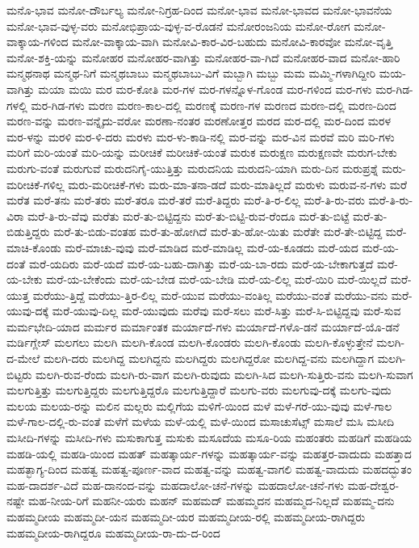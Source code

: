 {ಮನೊ-ಭಾವ
ಮನೋ-ದೌರ್ಬಲ್ಯ
ಮನೋ-ನಿಗ್ರಹ-ದಿಂದ
ಮನೋ-ಭಾವ
ಮನೋ-ಭಾವದ
ಮನೋ-ಭಾವನೆಯ
ಮನೋ-ಭಾವ-ವುಳ್ಳ-ವರು
ಮನೋಭಿಪ್ರಾಯ-ವುಳ್ಳ-ವ-ರೊಡನೆ
ಮನೋರಂಜನಿಯ
ಮನೋ-ರೋಗ
ಮನೋ-ವಾಕ್ಕಾಯ-ಗಳಿಂದ
ಮನೋ-ವಾಕ್ಕಾಯ-ವಾಗಿ
ಮನೋವಿ-ಕಾರ-ವಿರ-ಬಹುದು
ಮನೋವಿ-ಕಾರವೋ
ಮನೋ-ವೃತ್ತಿ
ಮನೋ-ಶಕ್ತಿ-ಯನ್ನು
ಮನೋಹರ
ಮನೋಹರ-ವಾಗಿತ್ತು
ಮನೋಹರ-ವಾ-ಗಿದೆ
ಮನೋಹರ-ವಾದ
ಮನೋ-ಹಾರಿ
ಮನ್ಮಥನಾಥ
ಮನ್ಮಥ-ನಿಗೆ
ಮನ್ಮಥಬಾಬು
ಮನ್ಮಥಬಾಬು-ವಿಗೆ
ಮಬ್ಬಾಗಿ
ಮಬ್ಬು
ಮಮ
ಮಮ್ಮಿ-ಗಳಾಗಿದ್ದೀರಿ
ಮಯ-ವಾಗಿತ್ತು
ಮಯಾ
ಮಯಿ
ಮರ
ಮರ-ಕೋತಿ
ಮರ-ಗಳ
ಮರ-ಗಳನ್ನೊಳ-ಗೊಂಡ
ಮರ-ಗಳಿಂದ
ಮರ-ಗಳು
ಮರ-ಗಿಡ-ಗಳಲ್ಲಿ
ಮರ-ಗಿಡ-ಗಳು
ಮರಣ
ಮರಣ-ಕಾಲ-ದಲ್ಲಿ
ಮರಣಕ್ಕೆ
ಮರಣ-ಗಳ
ಮರಣದ
ಮರಣ-ದಲ್ಲಿ
ಮರಣ-ದಿಂದ
ಮರಣ-ವನ್ನು
ಮರಣ-ವನ್ನೈದು-ವರೋ
ಮರಣಾ-ನಂತರ
ಮರಣೋತ್ತರ
ಮರದ
ಮರ-ದಲ್ಲಿ
ಮರ-ದಿಂದ
ಮರಳ
ಮರ-ಳನ್ನು
ಮರಳಿ
ಮರ-ಳಿ-ದರು
ಮರಳು
ಮರ-ಳು-ಕಾಡಿ-ನಲ್ಲಿ
ಮರ-ವನ್ನು
ಮರ-ವಿನ
ಮರವೆ
ಮರಿ
ಮರಿ-ಗಳು
ಮರಿಗೆ
ಮರಿ-ಯಂತೆ
ಮರಿ-ಯನ್ನು
ಮರೀಚಿಕೆ
ಮರೀಚಿಕೆ-ಯಂತೆ
ಮರುಕ
ಮರುಕ್ಷಣ
ಮರುಕ್ಷಣವೇ
ಮರುಗ-ಬೇಕು
ಮರುಗು-ವಂತೆ
ಮರುಗುವೆ
ಮರುದನಿಗೈ-ಯುತ್ತಿತ್ತು
ಮರುದನಿಯ
ಮರುದನಿ-ಯಾಗಿ
ಮರು-ದಿನ
ಮರುಪ್ರಶ್ನೆ
ಮರು-ಮರೀಚಿಕೆ-ಗಳಿಲ್ಲ
ಮರು-ಮರೀಚಿಕೆ-ಗಳು
ಮರು-ಮಾ-ತನಾ-ಡದೆ
ಮರು-ಮಾತಿಲ್ಲದೆ
ಮರುಳು
ಮರುವ-ನ-ಗಳು
ಮರೆ
ಮರೆತ
ಮರೆ-ತನು
ಮರೆ-ತರು
ಮರೆ-ತರೂ
ಮರೆ-ತರೆ
ಮರೆ-ತಿದ್ದರು
ಮರೆ-ತಿ-ರ-ಲಿಲ್ಲ
ಮರೆ-ತಿ-ರು-ವರು
ಮರೆ-ತಿ-ರು-ವಿರಾ
ಮರೆ-ತಿ-ರು-ವೆವು
ಮರೆತು
ಮರೆ-ತು-ಬಿಟ್ಟಿದ್ದನು
ಮರೆ-ತು-ಬಿಟ್ಟಿ-ರುವ-ರೆಂದೂ
ಮರೆ-ತು-ಬಿಟ್ಟೆ
ಮರೆ-ತು-ಬಿಡುತ್ತಿದ್ದರು
ಮರೆ-ತು-ಬಿಡು-ವಂತಹ
ಮರೆ-ತು-ಹೋಗಿದೆ
ಮರೆ-ತು-ಹೋ-ಯಿತು
ಮರೆತೇ
ಮರೆ-ತೇ-ಬಿಟ್ಟಿದ್ದ
ಮರೆ-ಮಾಚಿ-ಕೊಂಡು
ಮರೆ-ಮಾಚು-ವುವು
ಮರೆ-ಮಾಡಿದ
ಮರೆ-ಮಾಡಿಲ್ಲ
ಮರೆ-ಯ-ಕೂಡದು
ಮರೆ-ಯದ
ಮರೆ-ಯ-ದಂತೆ
ಮರೆ-ಯದಿರು
ಮರೆ-ಯದೆ
ಮರೆ-ಯ-ಬಹು-ದಾಗಿತ್ತು
ಮರೆ-ಯ-ಬಾ-ರದು
ಮರೆ-ಯ-ಬೇಕಾಗುತ್ತದೆ
ಮರೆ-ಯ-ಬೇಕು
ಮರೆ-ಯ-ಬೇಕೆಂದು
ಮರೆ-ಯ-ಬೇಡ
ಮರೆ-ಯ-ಬೇಡಿ
ಮರೆ-ಯ-ಲಿಲ್ಲ
ಮರೆ-ಯಿರಿ
ಮರೆ-ಯಿಲ್ಲದೆ
ಮರೆ-ಯುತ್ತ
ಮರೆಯು-ತ್ತಿದ್ದೆ
ಮರೆಯು-ತ್ತಿರ-ಲಿಲ್ಲ
ಮರೆ-ಯುವ
ಮರೆಯು-ವಂತಿಲ್ಲ
ಮರೆಯು-ವಂತೆ
ಮರೆಯು-ವನು
ಮರೆ-ಯುವು-ದಕ್ಕೆ
ಮರೆ-ಯುವು-ದಿಲ್ಲ
ಮರೆ-ಯುವುದು
ಮರೆವು
ಮರೆ-ಸಲು
ಮರೆ-ಸಿತ್ತು
ಮರೆ-ಸಿ-ಬಿಟ್ಟಿದ್ದವು
ಮರೆ-ಸುವ
ಮರ್ಮಭೇದಿ-ಯಾದ
ಮರ್ಮರ
ಮರ್ಮಾಂತಕ
ಮರ್ಯಾದೆ-ಗಳು
ಮರ್ಯಾದೆ-ಗಳೊ-ಡನೆ
ಮರ್ಯಾದೆ-ಯೊ-ಡನೆ
ಮರ್ಡಿಗ್ಲೇಸ್
ಮಲಗಲು
ಮಲಗಿ
ಮಲಗಿ-ಕೊಂಡ
ಮಲಗಿ-ಕೊಂಡರು
ಮಲಗಿ-ಕೊಂಡು
ಮಲಗಿ-ಕೊಳ್ಳುತ್ತೇನೆ
ಮಲಗಿ-ದ-ಮೇಲೆ
ಮಲಗಿ-ದರು
ಮಲಗಿದ್ದ
ಮಲಗಿದ್ದನು
ಮಲಗಿದ್ದರು
ಮಲಗಿದ್ದರೋ
ಮಲಗಿದ್ದ-ವನು
ಮಲಗಿದ್ದಾಗ
ಮಲಗಿ-ಬಿಟ್ಟರು
ಮಲಗಿ-ರುವ-ರೆಂದು
ಮಲಗಿ-ರು-ವಾಗ
ಮಲಗಿ-ರುವುದು
ಮಲಗಿ-ಸಿದ
ಮಲಗಿ-ಸುತ್ತಿರು-ವನು
ಮಲಗಿ-ಸುವಾಗ
ಮಲಗುತ್ತಿತ್ತು
ಮಲಗುತ್ತಿದ್ದರು
ಮಲಗುತ್ತಿದ್ದರೊ
ಮಲಗುತ್ತಿದ್ದಾರೆ
ಮಲಗು-ವರು
ಮಲಗುವು-ದಕ್ಕೆ
ಮಲಗು-ವುದು
ಮಲಯ
ಮಲಯ-ರನ್ನು
ಮಲಿನ
ಮಲ್ಲರು
ಮಲ್ಲಿಗೆಯ
ಮಳಿಗೆ-ಯಿಂದ
ಮಳೆ
ಮಳೆ-ಗರೆ-ಯು-ವುವು
ಮಳೆ-ಗಾಲ
ಮಳೆ-ಗಾಲ-ದಲ್ಲಿ-ರು-ವಂತೆ
ಮಳೆಗೆ
ಮಳೆಯ
ಮಳೆ-ಯಲ್ಲಿ
ಮಳೆ-ಯಿಂದ
ಮಸಾಚುಸೆಟ್ಸ್
ಮಸಾಲೆ
ಮಸಿ
ಮಸೀದಿ
ಮಸೀದಿ-ಗಳನ್ನು
ಮಸೀದಿ-ಗಳು
ಮಸುಕಾಗುತ್ತ
ಮಸುಕು
ಮಸೂದೆಯ
ಮಸೂ-ರಿಯ
ಮಹಂತರು
ಮಹಡಿಗೆ
ಮಹಡಿಯ
ಮಹಡಿ-ಯಲ್ಲಿ
ಮಹಡಿ-ಯಿಂದ
ಮಹತ್
ಮಹತ್ಕಾರ್ಯ-ಗಳನ್ನು
ಮಹತ್ಕಾರ್ಯ-ವನ್ನು
ಮಹತ್ತರ-ವಾದುದು
ಮಹತ್ತಾದ
ಮಹತ್ಭಾಗ್ಯ-ದಿಂದ
ಮಹತ್ವ
ಮಹತ್ವ-ಪೂರ್ಣ-ವಾದ
ಮಹತ್ವ-ವನ್ನು
ಮಹತ್ವ-ವಾಗಲಿ
ಮಹತ್ವ-ವಾದುದು
ಮಹದದ್ಭುತಂ
ಮಹ-ದಾದರ್ಶ-ವಿದೆ
ಮಹ-ದಾನಂದ-ವನ್ನು
ಮಹದಾಲೋ-ಚನೆ-ಗಳನ್ನು
ಮಹದಾಲೋ-ಚನೆ-ಗಳು
ಮಹ-ದೇಶ್ವರ-ನಷ್ಟೇ
ಮಹ-ನೀಯ-ರಿಗೆ
ಮಹನೀ-ಯರು
ಮಹನ್
ಮಹಮದ್
ಮಹಮ್ಮದನ
ಮಹಮ್ಮದ-ನಿಲ್ಲದೆ
ಮಹಮ್ಮ-ದನು
ಮಹಮ್ಮದೀಯ
ಮಹಮ್ಮದೀ-ಯನ
ಮಹಮ್ಮದೀ-ಯರ
ಮಹಮ್ಮದೀಯ-ರಲ್ಲಿ
ಮಹಮ್ಮದೀಯ-ರಾಗಿದ್ದರು
ಮಹಮ್ಮದೀಯ-ರಾಗಿದ್ದರೂ
ಮಹಮ್ಮದೀಯ-ರಾ-ದು-ದ-ರಿಂದ
}
